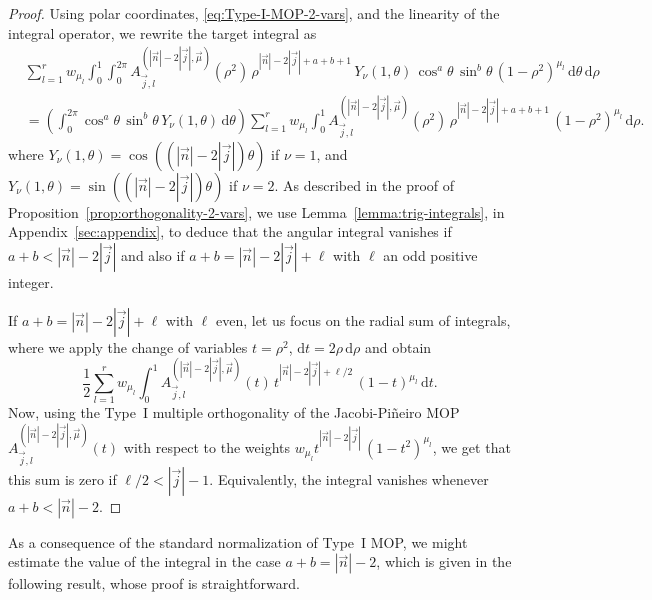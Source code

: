 \documentclass[a4paper]{article}
\theoremstyle{plain}
\theoremstyle{definition}
\newcommand{\dr}{\mathrm{d}}
\begin{document}
    \begin{proof}

    Using polar coordinates, \eqref{eq:Type-I-MOP-2-vars}, and the linearity of the integral operator, we rewrite the target integral as
    \begin{equation}
    \label{eq:integral-type-I-split}
        \begin{aligned}
        & \sum_{l=1}^r w_{\mu_l}\int_0^1\int_0^{2\pi} A^{(|\vec n|-2|\vec j|, \vec \mu)}_{\vec j,l}(\rho^2)\, \rho^{|\vec n|-2|\vec j|+a+b+1}\, Y_\nu(1, \theta)\,\cos^a\theta\,\sin^b\theta\, (1-\rho^2)^{\mu_l}\,\dr\theta\,\dr\rho\\
        &= \left(\int_{0}^{2\pi}\cos^a\theta\,\sin^b\theta \, Y_\nu(1, \theta)\,\dr\theta \right)\sum_{l=1}^r w_{\mu_l}\int_0^1 A^{(|\vec n|-2|\vec j|, \vec \mu)}_{\vec j,l}(\rho^2)\, \rho^{|\vec n|-2|\vec j|+a+b+1}\, (1-\rho^2)^{\mu_l}\,\dr\rho.
        \end{aligned}
    \end{equation}
    where $Y_\nu(1,\theta)=\cos((|\vec n|-2|\vec j|)\theta)$ if $\nu=1$, and $Y_\nu(1,\theta)=\sin((|\vec n|-2|\vec j|)\theta)$ if $\nu=2$. As described in the proof of Proposition~\ref{prop:orthogonality-2-vars}, we use Lemma~\ref{lemma:trig-integrals}, in Appendix~\ref{sec:appendix}, to deduce that the angular integral vanishes if $a+b<|\vec n|-2|\vec j|$ and also if $a+b=|\vec n|-2|\vec j|+\ell$ with $\ell$ an odd positive integer. 

    If $a+b=|\vec n|-2|\vec j|+\ell$ with $\ell$ even, let us focus on the radial sum of integrals, where we apply the change of variables $t = \rho^2$, $\dr t = 2\rho\,\dr \rho$ and obtain
    \begin{equation}
        \label{eq:integral-type-I}
        \dfrac 1 2 \sum_{l=1}^r w_{\mu_l}\int_0^1 A^{(|\vec n|-2|\vec j|, \vec \mu)}_{\vec j,l}(t)\, t^{|\vec n|-2|\vec j| + \ell/2}\, (1-t)^{\mu_l}\,\dr t.
    \end{equation}
    Now, using the Type~I multiple orthogonality of the Jacobi-Pi\~neiro MOP $A^{(|\vec n|-2|\vec j|, \vec \mu)}_{\vec j,l}(t)$ with respect to the weights $w_{\mu_l}t^{|\vec n|-2|\vec j|}\, (1-t^2)^{\mu_l}$, we get that this sum is zero if $\ell/2<|\vec j|-1$. Equivalently, the integral vanishes whenever $a+b<|\vec n|-2$.
    \end{proof}

    As a consequence of the standard normalization of Type~I MOP, we might estimate the value of the integral in the case $a+b=|\vec n|-2$, which is given in the following result, whose proof is straightforward.
    
\end{document}
